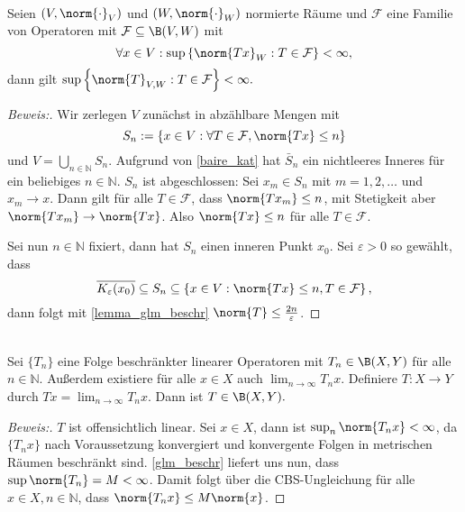 \begin{theorem} \label{glm_beschr} \\
	Seien $(V, \norm{\cdot}_V)$ und $(W, \norm{\cdot}_W)$ normierte Räume und $\mathcal{F}$ eine Familie von Operatoren mit $\mathcal{F} \subseteq \B(V, W)$ mit 
	\[
	\forall x \in V: \sup{\left\{\norm{Tx}_W: T \in \mathcal{F}\right\}} < \infty,
	\] 
	dann gilt $\sup{\left\{\norm{T}_{V, W}: T \in \mathcal{F}\right\}} < \infty.$
	
	\begin{proof}[Beweis:] 
		Wir zerlegen $V$ zunächst in abzählbare Mengen mit 
		\[
		S_n := \left\{ x \in V: \forall T \in \mathcal{F}, \norm{Tx} \leq n \right\} 
		\]
		und $V = \bigcup_{n \in \mathbb{N}} S_n$. Aufgrund von \ref{baire_kat} hat $\bar{S}_n$ ein nichtleeres Inneres für ein beliebiges $n \in \mathbb{N}$. $S_n$ ist abgeschlossen: Sei $x_m \in S_n$ mit $m = 1, 2, \ldots$ und $x_m \to x$. Dann gilt für alle $T \in \mathcal{F}$, dass $\norm{Tx_m} \leq n$, mit Stetigkeit aber $\norm{Tx_m} \to \norm{Tx}$. Also $\norm{Tx} \leq n$ für alle $T \in \mathcal{F}$.
		
		Sei nun $n \in \mathbb{N}$ fixiert, dann hat $S_n$ einen inneren Punkt $x_0$. Sei $\varepsilon > 0$ so gewählt, dass 
		\[
		\overline{K_{\varepsilon}(x_0)} \subseteq S_n \subseteq \left\{ x \in V: \norm{Tx} \leq n, T \in \mathcal{F} \right\},
		\]
		dann folgt mit \ref{lemma_glm_beschr} $\norm{T} \leq \frac{2n}{\varepsilon}$.
	\end{proof}
\end{theorem}

\begin{theorem} \\
	Sei $\{T_n\}$ eine Folge beschränkter linearer Operatoren mit $T_n \in \B(X, Y)$ für alle $n \in \mathbb{N}$. Außerdem existiere für alle $x \in X$ auch $\lim_{n \to \infty} T_n x$. Definiere $T: X \to Y$ durch $Tx = \lim_{n \to \infty} T_n x$. Dann ist $T \in \B(X, Y).$
	
	\begin{proof}[Beweis:] 
		$T$ ist offensichtlich linear. Sei $x \in X$, dann ist $\sup_{n}{\norm{T_n x}} < \infty$, da $\{T_n x\}$ nach Voraussetzung konvergiert und konvergente Folgen in metrischen Räumen beschränkt sind. \ref{glm_beschr} liefert uns nun, dass $\sup{\norm{T_n}} = M < \infty$. Damit folgt über die CBS-Ungleichung für alle $x \in X, n \in \mathbb{N}$, dass $\norm{T_n x} \leq M \norm{x}$.
	\end{proof}
\end{theorem}


